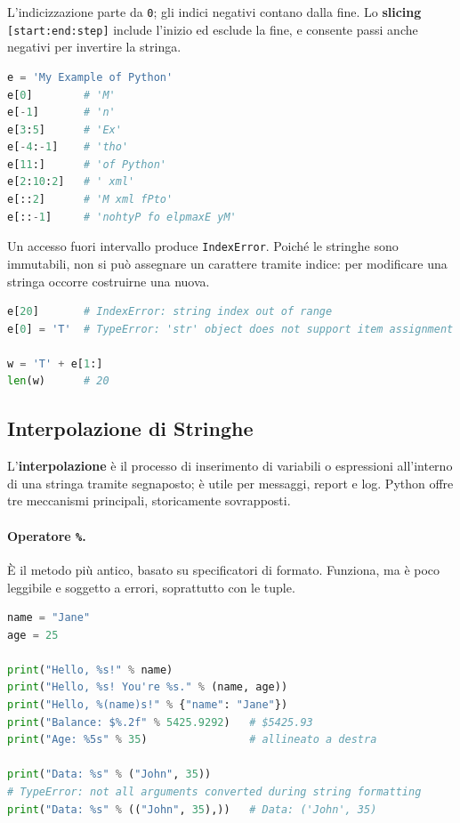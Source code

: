 \documentclass[12pt]{extarticle}
\begin{document}
\noindent L'indicizzazione parte da \texttt{0}; gli indici negativi contano dalla fine. Lo \textbf{slicing} \texttt{[start:end:step]} include l'inizio ed esclude la fine, e consente passi anche negativi per invertire la stringa.

\begin{lstlisting}[language=Python]
e = 'My Example of Python'
e[0]        # 'M'
e[-1]       # 'n'
e[3:5]      # 'Ex'
e[-4:-1]    # 'tho'
e[11:]      # 'of Python'
e[2:10:2]   # ' xml'
e[::2]      # 'M xml fPto'
e[::-1]     # 'nohtyP fo elpmaxE yM'
\end{lstlisting}

\noindent Un accesso fuori intervallo produce \texttt{IndexError}. Poiché le stringhe sono immutabili, non si può assegnare un carattere tramite indice: per modificare una stringa occorre costruirne una nuova.

\begin{lstlisting}[language=Python]
e[20]       # IndexError: string index out of range
e[0] = 'T'  # TypeError: 'str' object does not support item assignment

w = 'T' + e[1:]
len(w)      # 20
\end{lstlisting}

\subsection{Interpolazione di Stringhe}

\noindent L'\textbf{interpolazione} è il processo di inserimento di variabili o espressioni all'interno di una stringa tramite segnaposto; è utile per messaggi, report e log. Python offre tre meccanismi principali, storicamente sovrapposti.

\paragraph{Operatore \texttt{\%}.} È il metodo più antico, basato su specificatori di formato. Funziona, ma è poco leggibile e soggetto a errori, soprattutto con le tuple.

\begin{lstlisting}[language=Python]
name = "Jane"
age = 25

print("Hello, %s!" % name)
print("Hello, %s! You're %s." % (name, age))
print("Hello, %(name)s!" % {"name": "Jane"})
print("Balance: $%.2f" % 5425.9292)   # $5425.93
print("Age: %5s" % 35)                # allineato a destra

print("Data: %s" % ("John", 35))
# TypeError: not all arguments converted during string formatting
print("Data: %s" % (("John", 35),))   # Data: ('John', 35)
\end{lstlisting}
\end{document}
